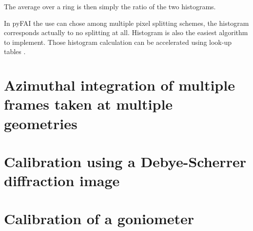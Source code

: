 \documentclass{iucr}              %
\begin{document}
The average over a ring is then simply the ratio of the two histograms.

In pyFAI the use can chose among multiple pixel splitting schemes, the histogram
corresponds actually to no splitting at all.
Histogram is also the easiest algorithm to implement.
Those histogram calculation can be accelerated using look-up tables \cite{}.

\section{Azimuthal integration of multiple frames taken at multiple geometries}



\section{Calibration using a Debye-Scherrer diffraction image}


\section{Calibration of a goniometer}
\end{document}
